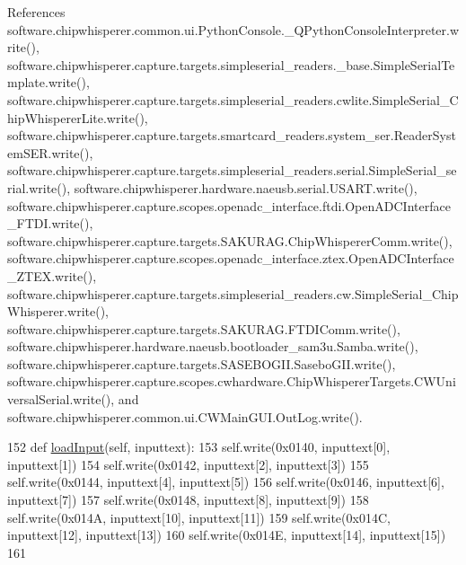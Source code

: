References software.\+chipwhisperer.\+common.\+ui.\+Python\+Console.\+\_\+\+Q\+Python\+Console\+Interpreter.\+write(), software.\+chipwhisperer.\+capture.\+targets.\+simpleserial\+\_\+readers.\+\_\+base.\+Simple\+Serial\+Template.\+write(), software.\+chipwhisperer.\+capture.\+targets.\+simpleserial\+\_\+readers.\+cwlite.\+Simple\+Serial\+\_\+\+Chip\+Whisperer\+Lite.\+write(), software.\+chipwhisperer.\+capture.\+targets.\+smartcard\+\_\+readers.\+system\+\_\+ser.\+Reader\+System\+S\+E\+R.\+write(), software.\+chipwhisperer.\+capture.\+targets.\+simpleserial\+\_\+readers.\+serial.\+Simple\+Serial\+\_\+serial.\+write(), software.\+chipwhisperer.\+hardware.\+naeusb.\+serial.\+U\+S\+A\+R\+T.\+write(), software.\+chipwhisperer.\+capture.\+scopes.\+openadc\+\_\+interface.\+ftdi.\+Open\+A\+D\+C\+Interface\+\_\+\+F\+T\+D\+I.\+write(), software.\+chipwhisperer.\+capture.\+targets.\+S\+A\+K\+U\+R\+A\+G.\+Chip\+Whisperer\+Comm.\+write(), software.\+chipwhisperer.\+capture.\+scopes.\+openadc\+\_\+interface.\+ztex.\+Open\+A\+D\+C\+Interface\+\_\+\+Z\+T\+E\+X.\+write(), software.\+chipwhisperer.\+capture.\+targets.\+simpleserial\+\_\+readers.\+cw.\+Simple\+Serial\+\_\+\+Chip\+Whisperer.\+write(), software.\+chipwhisperer.\+capture.\+targets.\+S\+A\+K\+U\+R\+A\+G.\+F\+T\+D\+I\+Comm.\+write(), software.\+chipwhisperer.\+hardware.\+naeusb.\+bootloader\+\_\+sam3u.\+Samba.\+write(), software.\+chipwhisperer.\+capture.\+targets.\+S\+A\+S\+E\+B\+O\+G\+I\+I.\+Sasebo\+G\+I\+I.\+write(), software.\+chipwhisperer.\+capture.\+scopes.\+cwhardware.\+Chip\+Whisperer\+Targets.\+C\+W\+Universal\+Serial.\+write(), and software.\+chipwhisperer.\+common.\+ui.\+C\+W\+Main\+G\+U\+I.\+Out\+Log.\+write().


\begin{DoxyCode}
152     \textcolor{keyword}{def }\hyperlink{classsoftware_1_1chipwhisperer_1_1capture_1_1targets_1_1SASEBOGII_1_1SaseboGIIAESRev1_ad10cf5a82010b0fa175f102e05600a34}{loadInput}(self, inputtext):
153         self.write(0x0140, inputtext[0], inputtext[1])
154         self.write(0x0142, inputtext[2], inputtext[3])
155         self.write(0x0144, inputtext[4], inputtext[5])
156         self.write(0x0146, inputtext[6], inputtext[7])
157         self.write(0x0148, inputtext[8], inputtext[9])
158         self.write(0x014A, inputtext[10], inputtext[11])
159         self.write(0x014C, inputtext[12], inputtext[13])
160         self.write(0x014E, inputtext[14], inputtext[15])
161 
\end{DoxyCode}
\hypertarget{classsoftware_1_1chipwhisperer_1_1capture_1_1targets_1_1SASEBOGII_1_1SaseboGIIAESRev1_a4c08e3bb8a9f7ec5622bc481f9a7038d}{}
